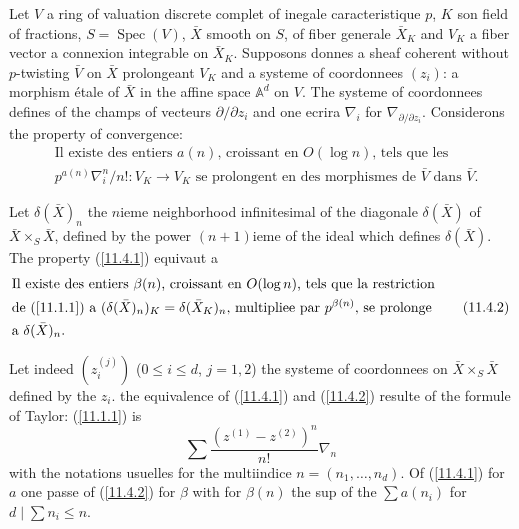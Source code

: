 \documentclass[12pt,a4paper]{article}
\theoremstyle{plain}
\theoremstyle{definition}
\theoremstyle{remark}
\DeclareMathOperator{\Spec}{Spec}
\begin{document}
Let $V$ a ring of valuation discrete complet of inegale caracteristique $p$, $K$ son field of fractions, $S = \Spec(V)$, $\bar{X}$ smooth on $S$, of fiber generale $\bar{X}_K$ and $V_K$ a fiber vector a connexion integrable on $\bar{X}_K$. Supposons donnes a sheaf coherent without $p$-twisting $\bar{V}$ on $\bar{X}$ prolongeant $V_K$ and a systeme of coordonnees $(z_i)$: a morphism étale of $\bar{X}$ in the affine space $\mathbb{A}^d$ on $V$. The systeme of coordonnees defines of the champs of vecteurs $\partial/\partial z_i$ and one ecrira $\nabla_i$ for $\nabla_{\partial/\partial z_i}$. Considerons the property of convergence:
\begin{equation}\label{11.4.1}
\begin{aligned}
&\text{Il existe des entiers } a(n) \text{, croissant en } O(\log n) \text{, tels que les} \\
&p^{a(n)} \nabla_i^n/n!: V_K \to V_K \text{ se prolongent en des morphismes de } \bar{V} \text{ dans } \bar{V}.
\end{aligned} \tag{11.4.1}
\end{equation}

Let $\delta(\bar{X})_n$ the $n$ieme neighborhood infinitesimal of the diagonale $\delta(\bar{X})$ of $\bar{X} \times_S \bar{X}$, defined by the power $(n+1)$ieme of the ideal which defines $\delta(\bar{X})$. The property (\ref{11.4.1}) equivaut a
\begin{equation}\label{11.4.2}
\begin{aligned}
&\text{Il existe des entiers } \beta(n) \text{, croissant en } O(\log n) \text{, tels que la restriction} \\
&\text{de (\ref{11.1.1}) a } (\delta(\bar{X})_n)_K = \delta(\bar{X}_K)_n \text{, multipliee par } p^{\beta(n)} \text{, se prolonge} \\
&\text{a } \delta(\bar{X})_n.
\end{aligned} \tag{11.4.2}
\end{equation}

Let indeed $(z_i^{(j)})$ ($0 \leq i \leq d$, $j = 1, 2$) the systeme of coordonnees on $\bar{X} \times_S \bar{X}$ defined by the $z_i$. the equivalence of (\ref{11.4.1}) and (\ref{11.4.2}) resulte of the formule of Taylor: (\ref{11.1.1}) is
$$\sum \frac{(z^{(1)} - z^{(2)})^n}{n!} \nabla_n$$
with the notations usuelles for the multiindice $n = (n_1, \ldots, n_d)$. Of (\ref{11.4.1}) for $a$ one passe of (\ref{11.4.2}) for $\beta$ with for $\beta(n)$ the sup of the $\sum a(n_i)$ for $d \mid \sum n_i \leq n$.
\end{document}

